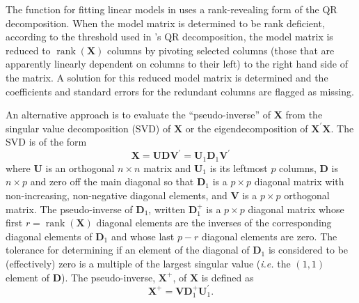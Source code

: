 \documentclass[shortnames,article]{jss}
\newcommand{\rank}{\operatorname{rank}}
\begin{document}
The  function for fitting linear models in  uses
a rank-revealing form of the QR decomposition.  When the model matrix
is determined to be rank deficient, according to the threshold used in
's QR decomposition, the model matrix is reduced to
$\rank{(\bm X)}$ columns by pivoting selected columns (those that are
apparently linearly dependent on columns to their left) to the right
hand side of the matrix.  A solution for this reduced model matrix is
determined and the coefficients and standard errors for the redundant
columns are flagged as missing.

An alternative approach is to evaluate the ``pseudo-inverse'' of $\bm
X$ from the singular value decomposition (SVD) of $\bm X$ or the
eigendecomposition of $\bm X^\prime\bm X$.  The SVD is of the form
\begin{displaymath}
  \bm X=\bm U\bm D\bm V^\prime=\bm U_1\bm D_1\bm V^\prime
\end{displaymath}
where $\bm U$ is an orthogonal $n\times n$ matrix and $\bm U_1$ is its
leftmost $p$ columns, $\bm D$ is $n\times p$ and zero off the main
diagonal so that $\bm D_1$ is a $p\times p$ diagonal matrix with
non-increasing, non-negative diagonal elements, and $\bm V$ is a $p\times
p$ orthogonal matrix.  The pseudo-inverse of $\bm D_1$, written $\bm
D_1^+$ is a $p\times p$ diagonal matrix whose first $r=\rank(\bm X)$
diagonal elements are the inverses of the corresponding diagonal
elements of $\bm D_1$ and whose last $p-r$ diagonal elements are zero.
The tolerance for determining if an element of the diagonal of $\bm D_1$
is considered to be (effectively) zero is a multiple of the largest
singular value (\textit{i.e.} the $(1,1)$ element of $\bm D$).
The pseudo-inverse, $\bm X^+$, of $\bm X$ is defined as
\begin{displaymath}
  \bm X^+=\bm V\bm D_1^+\bm U_1^\prime .
\end{displaymath}
\end{document}
